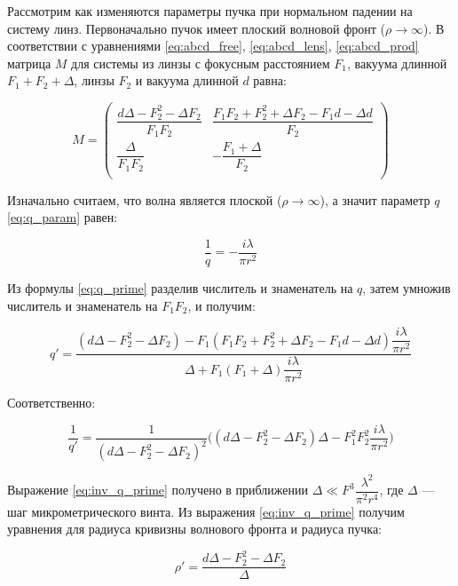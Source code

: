 Рассмотрим как изменяются параметры пучка при нормальном падении на систему линз. Первоначально пучок имеет плоский волновой фронт ($\rho \to \infty$). В соответствии с уравнениями \eqref{eq:abcd_free}, \eqref{eq:abcd_lens}, \eqref{eq:abcd_prod} матрица $M$ для системы из линзы с фокусным расстоянием $F_{1}$, вакуума длинной $F_{1} + F_{2} + \Delta$, линзы $F_{2}$ и вакуума длинной $d$ равна:

\begin{equation*}
M =
\begin{pmatrix}
 \dfrac{d\Delta - F_{2}^2 - \Delta F_{2}}{F_{1}F_{2}} & \dfrac{F_{1}F_{2} + F_{2}^2 + \Delta F_{2} - F_{1}d- \Delta d}{F_{2}} \\
\dfrac{\Delta}{F_{1} F_{2}} & - \dfrac{F_{1} + \Delta}{F_{2}} \\
\end{pmatrix}
\end{equation*}

Изначально считаем, что волна является плоской ($\rho \to \infty$), а значит параметр $q$ \eqref{eq:q_param} равен:

\begin{equation*}
    \dfrac{1}{q} = - \dfrac{i \lambda}{\pi r^2}
\end{equation*}

Из формулы \eqref{eq:q_prime} разделив числитель и знаменатель на $q$, затем умножив числитель и знаменатель на $F_{1} F_{2}$, и получим:

\begin{equation*}
    q' = \dfrac{(d\Delta - F_{2}^2 - \Delta F_{2}) - F_{1}(F_{1}F_{2} + F_{2}^2 + \Delta F_{2} - F_{1}d- \Delta d)\dfrac{i \lambda}{\pi r^2}}{\Delta + F_{1}(F_{1} + \Delta) \dfrac{i \lambda}{\pi r^2}} 
\end{equation*}

Соответственно:

\begin{equation}
    \dfrac{1}{q'}= \dfrac{1}{(d\Delta - F_{2}^2 -\Delta F_{2})^2} \Big((d\Delta - F_{2}^2 - \Delta F_{2})\Delta - F^{2}_{1}F^{2}_{2}\dfrac{i \lambda}{\pi r^2}\Big)
\label{eq:inv_q_prime}
\end{equation}

Выражение \eqref{eq:inv_q_prime} получено в приближении  $\Delta \ll F^3 \dfrac{ \lambda^2}{\pi^2 r^4}$, где $\Delta$ --- шаг микрометрического винта. Из выражения \eqref{eq:inv_q_prime} получим уравнения для радиуса кривизны волнового фронта и радиуса пучка: 

\begin{equation}
    \rho ' =  \dfrac{d\Delta - F_{2}^2 - \Delta F_{2}}{\Delta}
\end{equation}


